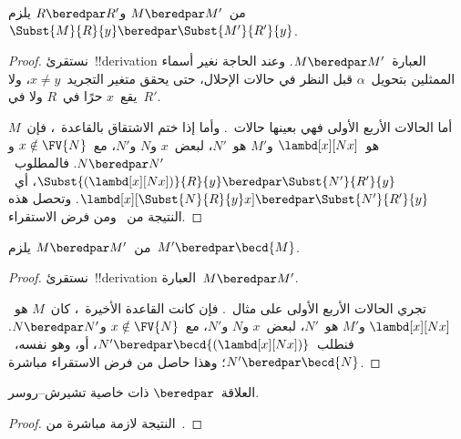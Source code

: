 \documentclass[../../../include/open-logic-section]{subfiles}
\begin{document}
\begin{lem}
  من~$M \beredpar M'$ و$R \beredpar R'$ يلزم~$\Subst{M}{R}{y}
  \beredpar \Subst{M'}{R'}{y}$.
\end{lem}

\begin{proof}
  نستقرئ~!!{derivation} العبارة~$M \beredpar M'$.
  وعند الحاجة نغير أسماء الممثلين بتحويل~$\alpha$ قبل النظر في حالات الإحلال،
  حتى يحقق متغير التجريد~$x \ne y$، ولا يقع~$x$ حرًا في~$R$ ولا في~$R'$.

  أما الحالات الأربع الأولى فهي بعينها حالات~.
  وأما إذا ختم الاشتقاق بالقاعدة~، فإن~$M$
  هو~$\lambd[x][Nx]$ و$M'$ هو~$N'$، لبعض~$x$ و$N$ و$N'$،
  مع~$x \notin \FV{N}$ و$N \beredpar N'$.
  فالمطلوب~$\Subst{(\lambd[x][Nx])}{R}{y} \beredpar \Subst{N'}{R'}{y}$،
  أي~$\lambd[x][\Subst{N}{R}{y} x] \beredpar \Subst{N'}{R'}{y}$.
  وتحصل هذه النتيجة من~
  ومن فرض الاستقراء.
\end{proof}

\begin{lem}
  من~$M \beredpar M'$ يلزم~$M' \beredpar \becd{M}$.
\end{lem}

\begin{proof}
  نستقرئ~!!{derivation} العبارة~$M \beredpar M'$.

  تجري الحالات الأربع الأولى على مثال~.
  فإن كانت القاعدة الأخيرة~، كان~$M$ هو~$\lambd[x][Nx]$
  و$M'$ هو~$N'$، لبعض~$x$ و$N$ و$N'$،
  مع~$x \notin \FV{N}$ و$N \beredpar N'$.
  فنطلب~$N' \beredpar \becd{(\lambd[x][Nx])}$،
  أو، وهو نفسه،~$N' \beredpar \becd{N}$؛ وهذا حاصل من فرض الاستقراء مباشرة.
\end{proof}

\begin{thm}
  العلاقة~$\beredpar$ ذات خاصية تشيرش--روسر.
\end{thm}

\begin{proof}
  النتيجة لازمة مباشرة من~.
\end{proof}
\end{document}
